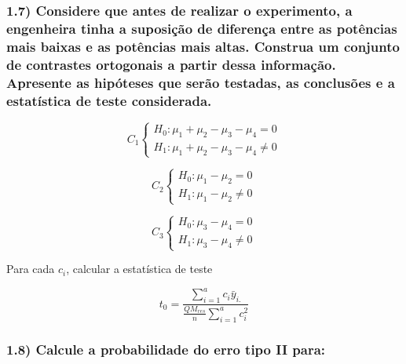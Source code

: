 \documentclass[
  a4paper]{article}
\begin{document}
\hypertarget{considere-que-antes-de-realizar-o-experimento-a-engenheira-tinha-a-suposiuxe7uxe3o-de-diferenuxe7a-entre-as-potuxeancias-mais-baixas-e-as-potuxeancias-mais-altas.-construa-um-conjunto-de-contrastes-ortogonais-a-partir-dessa-informauxe7uxe3o.-apresente-as-hipuxf3teses-que-seruxe3o-testadas-as-conclusuxf5es-e-a-estatuxedstica-de-teste-considerada.}{%
\subsubsection{1.7) Considere que antes de realizar o experimento, a
engenheira tinha a suposição de diferença entre as potências mais baixas
e as potências mais altas. Construa um conjunto de contrastes ortogonais
a partir dessa informação. Apresente as hipóteses que serão testadas, as
conclusões e a estatística de teste
considerada.}\label{considere-que-antes-de-realizar-o-experimento-a-engenheira-tinha-a-suposiuxe7uxe3o-de-diferenuxe7a-entre-as-potuxeancias-mais-baixas-e-as-potuxeancias-mais-altas.-construa-um-conjunto-de-contrastes-ortogonais-a-partir-dessa-informauxe7uxe3o.-apresente-as-hipuxf3teses-que-seruxe3o-testadas-as-conclusuxf5es-e-a-estatuxedstica-de-teste-considerada.}}

\[C_1 \begin{cases}
            H_0 : \mu_1 + \mu_2 - \mu_3 - \mu_4 = 0 \\
            H_1 : \mu_1 + \mu_2 - \mu_3 - \mu_4 \neq 0
        \end{cases}\]

\[C_2 \begin{cases}
            H_0 : \mu_1 - \mu_2 = 0 \\
            H_1 : \mu_1 - \mu_2 \neq 0
        \end{cases}\]

\[C_3 \begin{cases}
            H_0 : \mu_3 - \mu_4 = 0 \\
            H_1 : \mu_3 - \mu_4 \neq 0
        \end{cases}\]

Para cada \(c_i\), calcular a estatística de teste

\[t_0 = \frac{\sum_{i=1}^ac_i\bar{y}_{i.}}{\frac{QM_{res}}{n}\sum_{i=1}^ac_i^2}\]

\hypertarget{calcule-a-probabilidade-do-erro-tipo-ii-para}{%
\subsubsection{1.8) Calcule a probabilidade do erro tipo II
para:}\label{calcule-a-probabilidade-do-erro-tipo-ii-para}}
\end{document}
